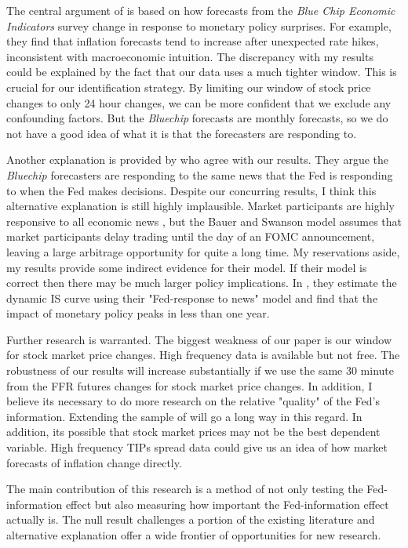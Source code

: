 \documentclass[a4paper,man,floatsintext,natbib]{apa6}
\begin{document}
		The central argument of \cite{Nakamura2018} is based on how forecasts from the \textit{Blue Chip Economic Indicators} survey change in response to monetary policy surprises. For example, they find that inflation forecasts tend to increase after unexpected rate hikes, inconsistent with macroeconomic intuition. The discrepancy with my results could be explained by the fact that our data uses a much tighter window. This is crucial for our identification strategy. By limiting our window of stock price changes to only 24 hour changes, we can be more confident that we exclude any confounding factors. But the \textit{Bluechip} forecasts are monthly forecasts, so we do not have a good idea of what it is that the forecasters are responding to. 
		
		Another explanation is provided by \cite{Bauer2020} who agree with our results. They argue the \textit{Bluechip} forecasters are responding to the same news that the Fed is responding to when the Fed makes decisions. Despite our concurring results, I think this alternative explanation is still highly implausible. Market participants are highly responsive to all economic news \citep{Gurkaynak2011}, but the Bauer and Swanson model assumes that market participants delay trading until the day of an FOMC announcement, leaving a large arbitrage opportunity for quite a long time. My reservations aside, my results provide some indirect evidence for their model. If their model is correct then there may be much larger policy implications. In \cite{Bauer2020}, they estimate the dynamic IS curve using their "Fed-response to news" model and find that the impact of monetary policy peaks in less than one year.
		
		Further research is warranted. The biggest weakness of our paper is our window for stock market price changes. High frequency data is available but not free. The robustness of our results will increase substantially if we use the same 30 minute from the FFR futures changes for stock market price changes. In addition, I believe its necessary to do more research on the relative "quality" of the Fed's information. Extending the sample of \cite{Romer2000} will go a long way in this regard. In addition, its possible that stock market prices may not be the best dependent variable. High frequency TIPs spread data could give us an idea of how market forecasts of inflation change directly. 
		
		The main contribution of this research is a method of not only testing the Fed-information effect but also measuring how important the Fed-information effect actually is. The null result challenges a portion of the existing literature and alternative explanation offer a wide frontier of opportunities for new research.
		
\end{document}
